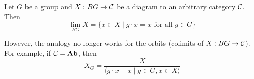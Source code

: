 \documentclass[a4paper]{article}
\begin{document}
\begin{prp}{}{} Let $G$ be a group and $X:BG\to\mathcal{C}$ be a diagram to an arbitrary category $\mathcal{C}$. Then $$\lim_{BG}X=\{x\in X\;|\;g\cdot x=x\text{ for all }g\in G\}$$
\end{prp}

However, the analogy no longer works for the orbits (colimits of $X:BG\to\mathcal{C}$). For example, if $\mathcal{C}=\bold{Ab}$, then $$X_G=\frac{X}{\langle g\cdot x-x\;|\;g\in G,x\in X\rangle}$$
\end{document}
